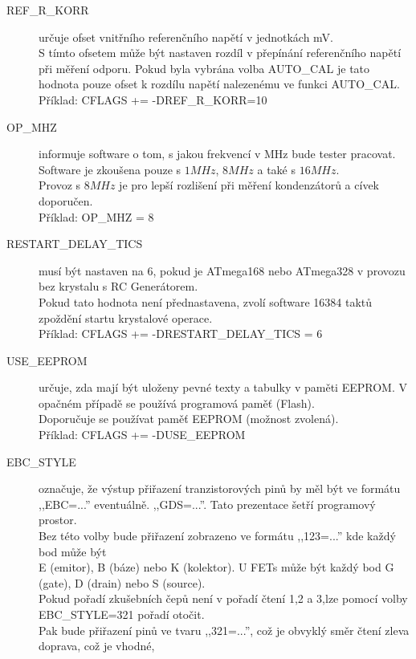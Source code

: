 \begin{description}
  \item[REF\_R\_KORR] určuje ofset vnitřního referenčního napětí v jednotkách mV.\\
S tímto ofsetem může být nastaven rozdíl v přepínání referenčního napětí při měření odporu.
Pokud byla vybrána volba AUTO\_CAL je tato hodnota pouze ofset k rozdílu napětí nalezenému ve
funkci AUTO\_CAL.\\
Příklad: CFLAGS += -DREF\_R\_KORR=10
\vspace{-0,3cm}
  \item[OP\_MHZ] informuje software o tom, s jakou frekvencí v MHz bude tester pracovat.\\
Software je zkoušena pouze s \(1MHz\), \(8MHz\) a také s \(16MHz\).\\ Provoz s \(8MHz\) je pro lepší rozlišení
při měření kondenzátorů a cívek doporučen.\\
Příklad: OP\_MHZ = 8
\vspace{-0,3cm}
  \item[RESTART\_DELAY\_TICS] musí být nastaven na 6, pokud je ATmega168 nebo ATmega328 v provozu bez krystalu s RC Generátorem.\\
Pokud tato hodnota není přednastavena, zvolí software 16384 taktů zpoždění startu 
krystalové operace.\\
Příklad: CFLAGS += -DRESTART\_DELAY\_TICS = 6
\vspace{-0,3cm}
  \item[USE\_EEPROM] určuje, zda mají být uloženy pevné texty a tabulky v paměti EEPROM.
V opačném případě se používá programová paměť (Flash).\\
Doporučuje se používat paměť EEPROM (možnost zvolená).\\
Příklad: CFLAGS += -DUSE\_EEPROM
\vspace{-0,3cm}
  \item[EBC\_STYLE] označuje, že výstup přiřazení tranzistorových pinů by měl být ve formátu  ,,EBC=...'' eventuálně. ,,GDS=...''.
Tato prezentace šetří programový prostor.\\ Bez této volby bude přiřazení zobrazeno ve formátu ,,123=...''  kde
každý bod může být\\ E (emitor), B (báze) nebo K (kolektor).
U FETs může být každý bod G (gate), D (drain) nebo S (source).\\
Pokud pořadí zkušebních čepů není v pořadí čtení 1,2 a 3,lze pomocí volby EBC\_STYLE=321 pořadí 
otočit.\\ Pak  bude přiřazení pinů ve tvaru ,,321=...'', což je obvyklý směr čtení zleva doprava, což je vhodné,

\end{description}
